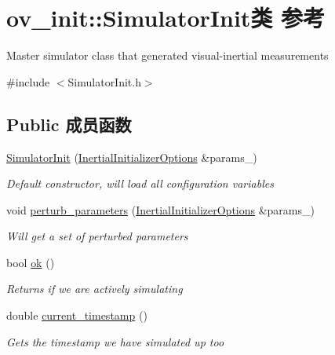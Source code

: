 \hypertarget{classov__init_1_1SimulatorInit}{}\section{ov\+\_\+init\+:\+:Simulator\+Init类 参考}
\label{classov__init_1_1SimulatorInit}


Master simulator class that generated visual-\/inertial measurements  




{\ttfamily \#include $<$Simulator\+Init.\+h$>$}

\subsection*{Public 成员函数}
\begin{DoxyCompactItemize}
\item 
\hyperlink{classov__init_1_1SimulatorInit_a6f8df388f25c2d90411bd51ade48c6e4}{Simulator\+Init} (\hyperlink{structov__init_1_1InertialInitializerOptions}{Inertial\+Initializer\+Options} \&params\+\_\+)
\begin{DoxyCompactList}\small\item\em Default constructor, will load all configuration variables \end{DoxyCompactList}\item 
void \hyperlink{classov__init_1_1SimulatorInit_a34f9e98902032aeb2b695e1f72f56d15}{perturb\+\_\+parameters} (\hyperlink{structov__init_1_1InertialInitializerOptions}{Inertial\+Initializer\+Options} \&params\+\_\+)
\begin{DoxyCompactList}\small\item\em Will get a set of perturbed parameters \end{DoxyCompactList}\item 
bool \hyperlink{classov__init_1_1SimulatorInit_a9a251dce8d062f3b152f9fa72a7f5dd1}{ok} ()
\begin{DoxyCompactList}\small\item\em Returns if we are actively simulating \end{DoxyCompactList}\item 
double \hyperlink{classov__init_1_1SimulatorInit_aca29b02e15f68526724d2dae56d2f756}{current\+\_\+timestamp} ()
\begin{DoxyCompactList}\small\item\em Gets the timestamp we have simulated up too \end{DoxyCompactList}\item 

\end{DoxyCompactItemize}
